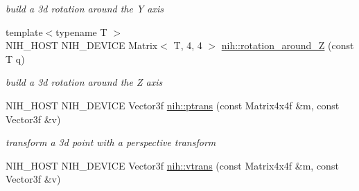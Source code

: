 \begin{DoxyCompactItemize}
\begin{DoxyCompactList}\small\item\em build a 3d rotation around the \-Y axis \end{DoxyCompactList}\item 
\hypertarget{group__linalg_gaa52af0191054c50d9ebd145331c61a78}{
{\footnotesize template$<$typename T $>$ }\\\-N\-I\-H\-\_\-\-H\-O\-S\-T \-N\-I\-H\-\_\-\-D\-E\-V\-I\-C\-E \-Matrix$<$ \-T, 4, 4 $>$ \hyperlink{group__linalg_gaa52af0191054c50d9ebd145331c61a78}{nih\-::rotation\-\_\-around\-\_\-\-Z} (const \-T q)}
\label{group__linalg_gaa52af0191054c50d9ebd145331c61a78}

\begin{DoxyCompactList}\small\item\em build a 3d rotation around the \-Z axis \end{DoxyCompactList}\item 
\hypertarget{group__linalg_ga33d8b434a7554e170c48d85be8a45efd}{
\-N\-I\-H\-\_\-\-H\-O\-S\-T \-N\-I\-H\-\_\-\-D\-E\-V\-I\-C\-E \-Vector3f \hyperlink{group__linalg_ga33d8b434a7554e170c48d85be8a45efd}{nih\-::ptrans} (const \-Matrix4x4f \&m, const \-Vector3f \&v)}
\label{group__linalg_ga33d8b434a7554e170c48d85be8a45efd}

\begin{DoxyCompactList}\small\item\em transform a 3d point with a perspective transform \end{DoxyCompactList}\item 
\hypertarget{group__linalg_ga90f6d2850e286d194db09300a4d99537}{
\-N\-I\-H\-\_\-\-H\-O\-S\-T \-N\-I\-H\-\_\-\-D\-E\-V\-I\-C\-E \-Vector3f \hyperlink{group__linalg_ga90f6d2850e286d194db09300a4d99537}{nih\-::vtrans} (const \-Matrix4x4f \&m, const \-Vector3f \&v)}
\label{group__linalg_ga90f6d2850e286d194db09300a4d99537}


\end{DoxyCompactItemize}
